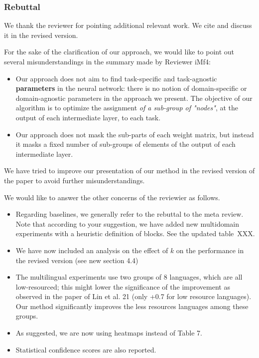 \documentclass[12pt,times,a4paper,twoside]{article}
\theoremstyle{definition}
\begin{document}
\subsubsection*{Rebuttal}
{\color{blue}%
We thank the reviewer for pointing additional relevant work. We cite and discuss it in the revised version.

For the sake of the clarification of our approach, we would like to point out several misunderstandings in the summary made by Reviewer iMf4:
\begin{itemize}
\item Our approach does not aim to find task-specific and task-agnostic \textbf{parameters} in the neural network: there is no notion of domain-specific or domain-agnostic parameters in the approach we present. The objective of our algorithm is to optimize the assignment \emph{of a sub-group of "nodes"}, at the output of each intermediate layer, to each task.
\item Our approach does not mask the sub-parts of each weight matrix, but instead it masks a fixed number of sub-groups of elements of the output of each intermediate layer.
\end{itemize}
We have tried to improve our presentation of our method in the revised version of the paper to avoid further misunderstandings.

We would like to answer the other concerns of the reviewier as follows. 
\begin{itemize} 
\item Regarding baselines, we generally refer to the rebuttal to the meta review. Note that according to your suggestion, we have added new multidomain experiments with a heuristic definition of blocks. See the updated table~XXX.
\item We have now included an analysis on the effect of $k$ on the performance in the revised version (see new section 4.4)
\item The multilingual experiments use two groups of $8$ languages, which are all low-resourced; this might lower the significance of the improvement as observed in the paper of Lin et al. 21 (only +0.7 for low resource languages). Our method significantly improves the less resources languages among these groups.
\item As suggested, we are now using heatmaps instead of Table 7.
\item Statistical confidence scores are also reported. 
\end{itemize}
}
\end{document}
